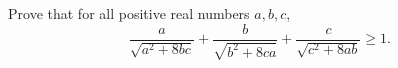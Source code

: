 Prove that for all positive real numbers $a, b, c$,
\[ \frac{a}{\sqrt{a^2 + 8bc}} + \frac{b}{\sqrt{b^2 + 8ca}} + \frac{c}{\sqrt{c^2 + 8ab}} \geq 1. \]
